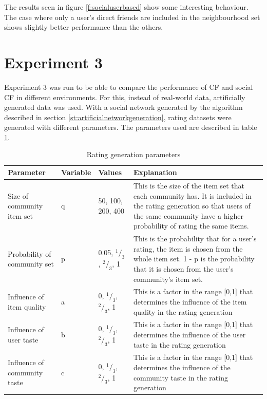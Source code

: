 The results seen in figure \ref{f:socialuserbased} show some interesting behaviour. The case where only a user's direct friends are included in the neighbourhood set shows slightly better performance than the others. 
\section{Experiment 3}
\label{st:experiment3} Experiment 3 was run to be able to compare the performance of CF and social CF in different environments. For this, instead of real-world data, artificially generated data was used. With a social network generated by the algorithm described in section \ref{st:artificialnetworkgeneration}, rating datasets were generated with different parameters. The parameters used are described in table \ref{t:ratinggenerationparameters}.

\begin{table}[h]
	\begin{center}
    	\begin{tabular}{ | l | l | l | p{5.5cm} |}
   	 \hline
    	Parameter & Variable & Values & Explanation \\ \hline
    	Size of community item set & q & 50, 100, 200, 400 & This is the size of the item set that each community has. It is included in the rating generation so that users of the same community have a higher probability of rating the same items.  \\ \hline
    	Probability of community set & p & 0.05, $^1 / _3$, $^2 / _3$, 1 & This is the probability that for a user's rating, the item is chosen from the whole item set. 1 - p is the probability that it is chosen from the user's community's item set. \\ \hline
    	Influence of item quality & a & 0, $^1 / _3$, $^2 / _3$, 1 & This is a factor in the range [0,1] that determines the influence of the item quality in the rating generation \\ \hline
    	Influence of user taste & b & 0, $^1 / _3$, $^2 / _3$, 1 & This is a factor in the range [0,1] that determines the influence of the user taste in the rating generation \\ \hline
    	Influence of community taste & c & 0, $^1 / _3$, $^2 / _3$, 1 & This is a factor in the range [0,1] that determines the influence of the community taste in the rating generation \\ \hline
    	\end{tabular}
    	\caption{Rating generation parameters}
    	\label{t:ratinggenerationparameters}
    	\end{center}
\end{table}

